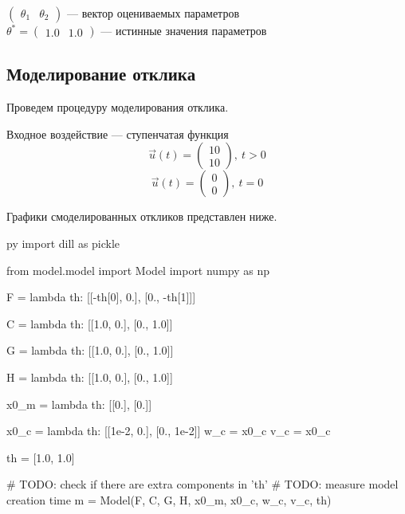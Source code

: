 \documentclass[a4paper,14pt]{extarticle}
\begin{document}
$\begin{pmatrix} \theta_1 & \theta_2 \end{pmatrix}$ --- вектор оцениваемых
	параметров \\ \indent $\theta^{*} = \begin{pmatrix} 1.0 & 1.0 \end{pmatrix}$
		--- истинные значения параметров

\newpage
\subsection{Моделирование отклика}

Проведем процедуру моделирования отклика. 

Входное воздействие --- ступенчатая функция
\[
	\vec{u}(t) = \begin{pmatrix} 10 \\ 10 \end{pmatrix},\ t > 0
\]
\[
	\vec{u}(t) = \begin{pmatrix} 0 \\ 0 \end{pmatrix},\ t = 0
\]

Графики смоделированных откликов представлен ниже.

\begin{pythontexcustomcode}{py}
import dill as pickle
\end{pythontexcustomcode}

\renewcommand{\baselinestretch}{1}
\begin{pycode}[model]
from model.model import Model
import numpy as np

F = lambda th: [[-th[0], 0.],
                [0., -th[1]]]

C = lambda th: [[1.0, 0.],
                [0., 1.0]]

G = lambda th: [[1.0, 0.],
                [0., 1.0]]

H = lambda th: [[1.0, 0.],
                [0., 1.0]]

x0_m = lambda th: [[0.],
                   [0.]]

x0_c = lambda th: [[1e-2, 0.],
                   [0., 1e-2]]
w_c = x0_c
v_c = x0_c

th = [1.0, 1.0]

# TODO: check if there are extra components in 'th'
# TODO: measure model creation time
m = Model(F, C, G, H, x0_m, x0_c, w_c, v_c, th)
\end{pycode}
\renewcommand{\baselinestretch}{1.5}
\end{document}
